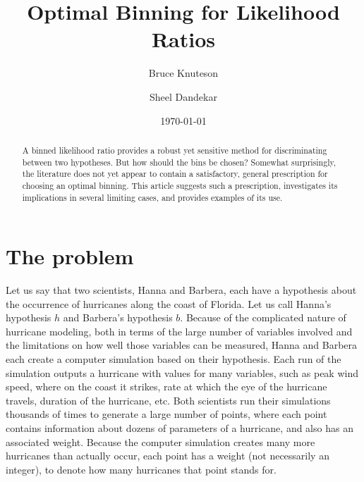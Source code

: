 \documentclass[twocolumn,twoside,prd]{revtex4} %
\begin{document}

\title{Optimal Binning for Likelihood Ratios}
\author{Bruce Knuteson}

\author{Sheel Dandekar}



\date{\today}

\begin{abstract}
A binned likelihood ratio provides a robust yet sensitive method for discriminating between two hypotheses.  But how should the bins be chosen?  Somewhat surprisingly, the literature does not yet appear to contain a satisfactory, general prescription for choosing an optimal binning.  This article suggests such a prescription, investigates its implications in several limiting cases, and provides examples of its use.   
\end{abstract}

\maketitle
\tableofcontents %


\section{The problem}

Let us say that two scientists, Hanna and Barbera, each have a hypothesis about the occurrence of hurricanes along the coast of Florida.  Let us call Hanna's hypothesis $h$ and Barbera's hypothesis $b$.  Because of the complicated nature of hurricane modeling, both in terms of the large number of variables involved and the limitations on how well those variables can be measured, Hanna and Barbera each create a computer simulation based on their hypothesis.  Each run of the simulation outputs a hurricane with values for many variables, such as peak wind speed, where on the coast it strikes, rate at which the eye of the hurricane travels, duration of the hurricane, etc.  Both scientists run their simulations thousands of times to generate a large number of points, where each point contains information about dozens of parameters of a hurricane, and also has an associated weight.  Because the computer simulation creates many more hurricanes than actually occur, each point has a weight (not necessarily an integer), to denote how many hurricanes that point stands for.  
 
\end{document}
